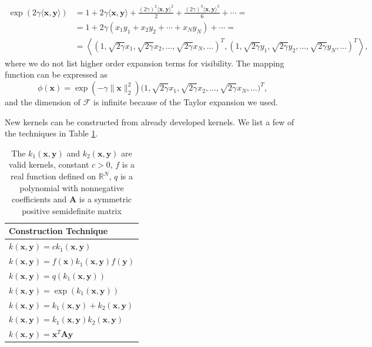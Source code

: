 \documentclass[11pt,oneside,czech,american]{book} %
\theoremstyle{plain}
\theoremstyle{definition}
\begin{document}
\begin{equation}
	\begin{aligned}
		\exp(2\gamma \langle \bm{x}, \bm{y} \rangle ) &= 1 + 2\gamma \langle \bm{x}, \bm{y} \rangle + \frac{(2\gamma)^2 \langle \bm{x}, \bm{y} \rangle^2}{2} + \frac{(2\gamma)^3 \langle \bm{x}, \bm{y} \rangle^3}{6} + \cdots = \\
		&= 1 + 2\gamma (x_1 y_1 + x_2 y_2 + \cdots + x_N y_N)  + \cdots = \\
		&= \left\langle( 1, \sqrt{2\gamma} x_1, \sqrt{2\gamma} x_2, \dots, \sqrt{2\gamma} x_N, \dots )^T, ( 1, \sqrt{2\gamma} y_1, \sqrt{2\gamma} y_2, \dots, \sqrt{2\gamma} y_N, \dots )^T \right\rangle,
	\end{aligned}
\end{equation}
where we do not list higher order expansion terms for visibility. The mapping function can be expressed as
\begin{equation}
	\phi(\bm{x}) = \exp(-\gamma \|\bm{x} \|^2_2)\Big( 1, \sqrt{2\gamma} x_1, \sqrt{2\gamma} x_2, \dots, \sqrt{2\gamma} x_N, \dots \Big)^T,
\end{equation}
and the dimension of $\mathcal{F}$ is infinite because of the Taylor expansion we used.

New kernels can be constructed from already developed kernels. We list a few of the techniques in Table \ref{techniques}.

\begin{table}[H]
	\centering
	\begin{tabular}{l} 
		\hline
		Construction Technique  \\ 
		\hline
		$k(\bm{x}, \bm{y}) = c k_1(\bm{x}, \bm{y})$   \\
		$k(\bm{x}, \bm{y}) = f(\bm{x})k_1(\bm{x}, \bm{y}) f(\bm{y})$  \\
		$k(\bm{x}, \bm{y}) = q(k_1(\bm{x}, \bm{y}))$   \\
		$k(\bm{x}, \bm{y}) = \exp(k_1(\bm{x}, \bm{y}))$    \\
		$k(\bm{x}, \bm{y}) = k_1(\bm{x}, \bm{y}) + k_2(\bm{x}, \bm{y})$  \\
		$k(\bm{x}, \bm{y}) = k_1(\bm{x}, \bm{y}) k_2(\bm{x}, \bm{y})$\\
		$k(\bm{x}, \bm{y}) = \bm{x}^T \bm{A} \bm{y}$                     \\
		\hline
	\end{tabular}
	\caption{The $k_1(\bm{x}, \bm{y})$ and $k_2(\bm{x}, \bm{y})$ are valid kernels, constant $c>0$, $f$ is a real function defined on $\mathbb{R}^N$, $q$ is a polynomial with nonnegative coefficients and $\bm{A}$ is a symmetric positive semidefinite matrix}
	\label{techniques}
\end{table}
\end{document}
